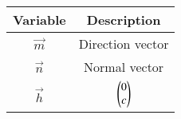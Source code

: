 \begin{tabular}[12pt]{ |c|c|}
    \hline
    \textbf{Variable} & \textbf{Description}\\ 
    \hline
    $\vec{m}$ & Direction vector\\
    \hline
    $\vec{n}$ & Normal vector\\
    \hline
    $\vec{h}$ & $\begin{pmatrix}0\\c\end{pmatrix}$\\
    \hline
    \end{tabular}
